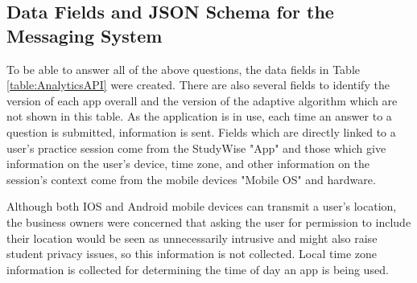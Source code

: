 \documentclass[runningheads,a4paper]{llncs}
\begin{document}
\subsection{Data Fields and JSON Schema for the Messaging System}

To be able to answer all of the above questions, the data fields in Table \ref{table:AnalyticsAPI} were created.  There are also several fields to identify the  version of each app overall and the version of the adaptive algorithm which are not shown in this table.  As the application is in use, each time an answer to a question is submitted, information is sent.  Fields which are directly linked to a user's practice session come from the  StudyWise "App" and those which give information on the user's device, time zone, and other information on the session's context come from the mobile devices "Mobile OS" and hardware.

Although both IOS and Android mobile devices can transmit a user's location, the business owners were concerned that asking the user for permission to include their location would be seen as unnecessarily intrusive and might also raise student privacy issues, so this information is not collected.  Local time zone information is collected for determining the time of day an app is being used.
\end{document}
